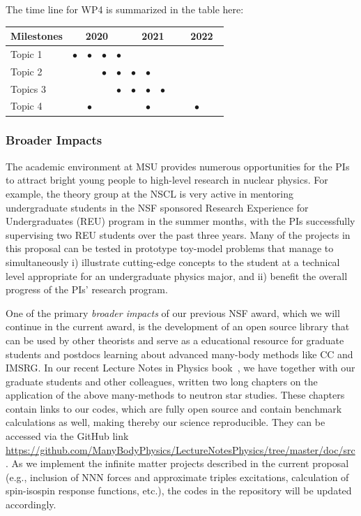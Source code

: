 \documentclass[10pt]{article}
\begin{document}
The time line for WP4 is summarized in the table here:
\begin{footnotesize}
\begin{center}
\begin{tabular}{|l|c|c|c|c|c|c|c|c|c|c|c|c|}
\hline
\multicolumn{1}{|l}{Milestones } & \multicolumn{4}{|c|}{ 2020 } & \multicolumn{4}{c|}{ 2021 } & \multicolumn{4}{c|}{ 2022 } \\
\hline
Topic 1 &$\bullet$ &$\bullet$ &$\bullet$ &$\bullet$ & & & & & & & &  \\
\hline
Topic 2 & & &$\bullet$ &$\bullet$ &$\bullet$ &$\bullet$ & & & & & &  \\
\hline
Topics 3 & & & & $\bullet$ &$\bullet$ &$\bullet$ &$\bullet$ & & & & &  \\
\hline
Topic 4 & &$\bullet$ & & & &$\bullet$ & & & &$\bullet$ & &  \\
\hline

\end{tabular}
\end{center}
\end{footnotesize}

\subsubsection{Broader Impacts}

The academic environment at MSU provides numerous opportunities for
the PIs to attract bright young people to high-level research in
nuclear physics. For example, the theory group at the NSCL is very
active in mentoring undergraduate students in the NSF sponsored
Research Experience for Undergraduates (REU) program in the summer
months, with the PIs successfully supervising two REU students over
the past three years. Many of the projects in this proposal can be
tested in prototype toy-model problems that manage to simultaneously
i) illustrate cutting-edge concepts to the student at a technical
level appropriate for an undergraduate physics major, and ii) benefit
the overall progress of the PIs' research program.

One of the primary \emph{broader impacts} of our previous NSF award,
which we will continue in the current award, is the development of an
open source library that can be used by other theorists and serve as a
educational resource for graduate students and postdocs learning about
advanced many-body methods like CC and IMSRG.  In our recent Lecture
Notes in Physics book~\cite{lnp}, we have together with our graduate
students and other colleagues, written two long chapters on the
application of the above many-methods to neutron star studies. These
chapters contain links to our codes, which are fully open source and
contain benchmark calculations as well, making thereby our science
reproducible. They can be accessed via the GitHub link
\url{https://github.com/ManyBodyPhysics/LectureNotesPhysics/tree/master/doc/src}. As
we implement the infinite matter projects described in the current
proposal (e.g., inclusion of NNN forces and approximate triples
excitations, calculation of spin-isospin response functions, etc.),
the codes in the repository will be updated accordingly.
\end{document}
